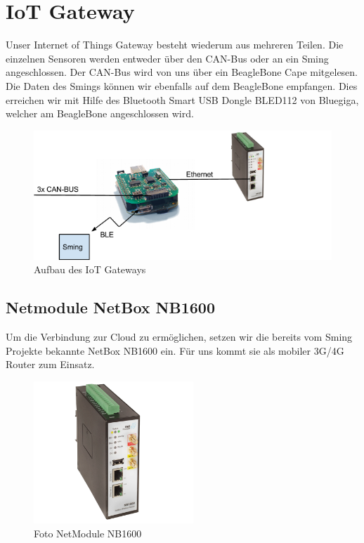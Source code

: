 \chapter{IoT Gateway}\label{chap:iotgateway}

Unser Internet of Things Gateway besteht wiederum aus mehreren Teilen. Die einzelnen Sensoren werden entweder über den CAN-Bus oder an ein Sming angeschlossen. Der CAN-Bus wird von uns über ein BeagleBone Cape mitgelesen. Die Daten des Smings können wir ebenfalls auf dem BeagleBone empfangen. Dies erreichen wir mit Hilfe des Bluetooth Smart USB Dongle BLED112 von Bluegiga, welcher am BeagleBone angeschlossen wird.

\begin{figure}[hbtp]
    \center
    \includegraphics[width=\textwidth]{bilder/aufbau_in_auto.png}
    \caption{Aufbau des IoT Gateways}
    \label{fig:aufbau_iot_gateway}
\end{figure}

\section{Netmodule NetBox NB1600}\label{sec:netbox}
Um die Verbindung zur Cloud zu ermöglichen, setzen wir die bereits vom Sming Projekte bekannte NetBox NB1600 ein. Für uns kommt sie als mobiler 3G/4G Router zum Einsatz.

\begin{figure}[hbtp]
	\center
	\includegraphics[width=6cm]{bilder/netmodule.png}
	\caption{Foto NetModule NB1600}
	\label{fig:netbox}
\end{figure}


